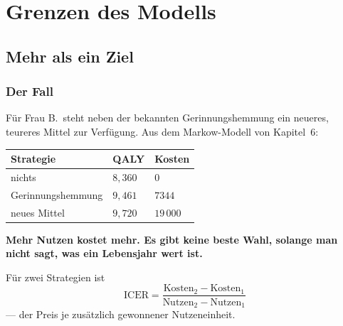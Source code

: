 \part{Grenzen des Modells}

\chapter{Mehr als ein Ziel}

\section{Der Fall}

\begin{merksatz}
Für Frau B.\ steht neben der bekannten Gerinnungshemmung ein neueres, teureres Mittel zur Verfügung. Aus dem Markow-Modell von Kapitel~6:

\begin{center}
{\small
\renewcommand{\arraystretch}{1.5}
\begin{tabular}{@{}P{3.6cm}P{2.0cm}P{2.2cm}@{}}
\toprule
\textbf{Strategie} & \textbf{QALY} & \textbf{Kosten}\\
\midrule
nichts & $8{,}360$ & $0$\\
Gerinnungshemmung & $9{,}461$ & $7344$\\
neues Mittel & $9{,}720$ & $19\,000$\\
\bottomrule
\end{tabular}}
\end{center}

\begin{center}
\begin{minipage}{0.9\textwidth}
\textbf{Mehr Nutzen kostet mehr. Es gibt keine beste Wahl, solange man nicht sagt, was ein Lebensjahr wert ist.}
\end{minipage}
\end{center}
\end{merksatz}

\begin{definition}
Für zwei Strategien ist
\[ \text{ICER} = \frac{\text{Kosten}_2 - \text{Kosten}_1}{\text{Nutzen}_2 - \text{Nutzen}_1} \]
--- der Preis je zusätzlich gewonnener Nutzeneinheit.
\end{definition}

